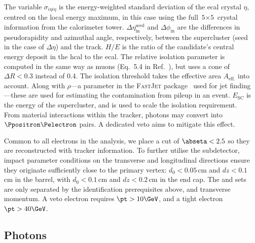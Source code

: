 The variable $\sigma_{i\eta i\eta}$ is the energy-weighted standard deviation of the \acrshort{ecal} crystal $\eta$, centred on the local energy maximum, in this case using the full $\text{5} \times \text{5}$ crystal information from the calorimeter tower. $\Delta\eta_{\mathrm{in}}^{\mathrm{seed}}$ and $\Delta\phi_{\mathrm{in}}$ are the differences in pseudorapidity and azimuthal angle, respectively, between the supercluster (seed in the case of $\Delta\eta$) and the track. $H/E$ is the ratio of the candidate's central energy deposit in the \acrshort{hcal} to the \acrshort{ecal}. The relative isolation parameter is computed in the same way as muons (Eq.~5.4 in Ref.~\citenumNegSpace), but uses a cone of $\Delta R < \text{0.3}$ instead of 0.4. The isolation threshold takes the effective area $A_{\mathrm{eff.}}$ into account. Along with $\rho$---a parameter in the \textsc{FastJet} package~\cite{Cacciari:2011fastjet} used for \gls{jet} finding---these are used for estimating the contamination from pileup in an event. $E_{\mathrm{SC}}$ is the energy of the supercluster, and is used to scale the isolation requirement. From material interactions within the tracker, photons may convert into $\Ppositron\Pelectron$ pairs. A dedicated veto aims to mitigate this effect.

Common to all electrons in the analysis, we place a cut of $\abseta < \text{2.5}$ so they are reconstructed with tracker information. To further utilise the subdetector, impact parameter conditions on the transverse and longitudinal directions ensure they originate sufficiently close to the primary vertex: $d_0 < \text{0.05}$\,cm and $dz < \text{0.1}$\,cm in the barrel, with $d_0 < \text{0.1}$\,cm and $dz < \text{0.2}$\,cm in the end cap. The \vetoEle and \tightEle sets are only separated by the identification prerequisites above, and transverse momentum. A veto electron requires $\pt > \text{10}\GeV$, and a tight electron $\pt > \text{40}\GeV$.




\subsection{Photons}
\label{subsec:objects_photons}

